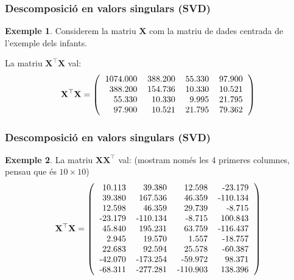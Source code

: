 \documentclass[12pt,t]{beamer}
\theoremstyle{plain}
\theoremstyle{definition}
\newtheorem{exemple}{Exemple}
\begin{document}
\begin{frame}
\frametitle{Descomposició en valors singulars (SVD)}
\begin{exemple}
Considerem la matriu $\mathbf{X}$ com la matriu de dades centrada de l'exemple dels infants.
\medskip

La matriu $\mathbf{X}^\top\mathbf{X}$ val:
\[
\mathbf{X}^\top\mathbf{X}=\left(
\begin{tabular}{rrrr}
  1074.000 & 388.200 & 55.330 & 97.900 \\ 
  388.200 & 154.736 & 10.330 & 10.521 \\ 
  55.330 & 10.330 & 9.995 & 21.795 \\ 
  97.900 & 10.521 & 21.795 & 79.362 \\ 
  \end{tabular}\right)
\]
\end{exemple}
\end{frame}

\begin{frame}
\frametitle{Descomposició en valors singulars (SVD)}
\begin{exemple}
La matriu $\mathbf{X}\mathbf{X}^\top$ val: (mostram només les 4 primeres columnes, pensau que és $10\times 10$)
{\footnotesize
\[
\mathbf{X}^\top\mathbf{X}=\left(
\begin{tabular}{rrrr}
  10.113 & 39.380 & 12.598 & -23.179 \\ 
  39.380 & 167.536 & 46.359 & -110.134 \\ 
  12.598 & 46.359 & 29.739 & -8.715 \\ 
  -23.179 & -110.134 & -8.715 & 100.843 \\ 
  45.840 & 195.231 & 63.759 & -116.437 \\ 
  2.945 & 19.570 & 1.557 & -18.757 \\ 
  22.683 & 92.594 & 25.578 & -60.387 \\ 
  -42.070 & -173.254 & -59.972 & 98.371 \\ 
  -68.311 & -277.281 & -110.903 & 138.396 \\ 
  \end{tabular}\right)
\]
}
\end{exemple}
\end{frame}
\end{document}
